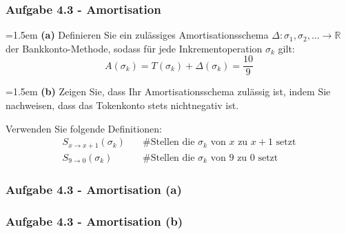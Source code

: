 \documentclass{beamer}
\begin{document}
\begin{frame}
	\frametitle{Aufgabe 4.3 - Amortisation}

	\hangindent=1.5em
	\textbf{(a)} Definieren Sie ein zulässiges Amortisationsschema $\Delta: {\sigma_1, \sigma_2, \dots} \to \mathbb{R}$ der Bankkonto-Methode, sodass für jede Inkrementoperation $\sigma_k$ gilt:
	$$A(\sigma_k) = T(\sigma_k) + \Delta(\sigma_k) = \frac{10}{9}$$

	\smallskip

	\hangindent=1.5em
	\textbf{(b)} Zeigen Sie, dass Ihr Amortisationsschema zulässig ist, indem Sie nachweisen, dass das
	Tokenkonto stets nichtnegativ ist.

	\bigskip

	Verwenden Sie folgende Definitionen:
	\begin{align*}
		S_{x \rightarrow x+1}(\sigma_k) \quad & \text{\#Stellen die } \sigma_k \text{ von } x \text{ zu } x+1 \text{ setzt} \\
		S_{9 \rightarrow 0}(\sigma_k) \quad   & \text{\#Stellen die } \sigma_k \text{ von } 9 \text{ zu } 0 \text{ setzt}
	\end{align*}
\end{frame}

\begin{frame}
	\frametitle{Aufgabe 4.3 - Amortisation (a)}
\end{frame}

\begin{frame}
	\frametitle{Aufgabe 4.3 - Amortisation (b)}
\end{frame}
\end{document}
